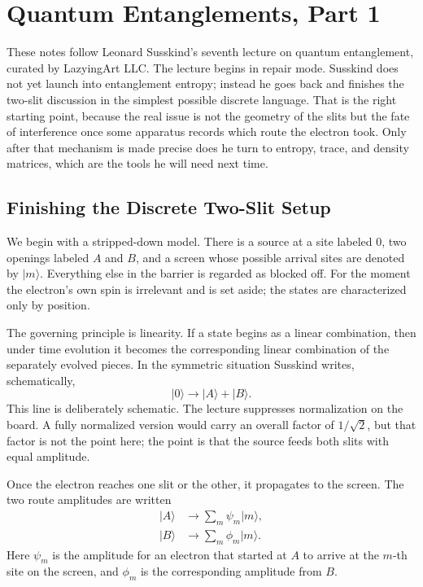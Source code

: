 \chapter{Quantum Entanglements, Part 1}

These notes follow Leonard Susskind's seventh lecture on quantum entanglement, curated by LazyingArt LLC. The lecture begins in repair mode. Susskind does not yet launch into entanglement entropy; instead he goes back and finishes the two-slit discussion in the simplest possible discrete language. That is the right starting point, because the real issue is not the geometry of the slits but the fate of interference once some apparatus records which route the electron took. Only after that mechanism is made precise does he turn to entropy, trace, and density matrices, which are the tools he will need next time.

\section{Finishing the Discrete Two-Slit Setup}

We begin with a stripped-down model. There is a source at a site labeled \(0\), two openings labeled \(A\) and \(B\), and a screen whose possible arrival sites are denoted by \(|m\rangle\). Everything else in the barrier is regarded as blocked off. For the moment the electron's own spin is irrelevant and is set aside; the states are characterized only by position.

The governing principle is linearity. If a state begins as a linear combination, then under time evolution it becomes the corresponding linear combination of the separately evolved pieces. In the symmetric situation Susskind writes, schematically,
\begin{equation}
|0\rangle \longrightarrow |A\rangle + |B\rangle .
\end{equation}
This line is deliberately schematic. The lecture suppresses normalization on the board. A fully normalized version would carry an overall factor of \(1/\sqrt{2}\), but that factor is not the point here; the point is that the source feeds both slits with equal amplitude.

Once the electron reaches one slit or the other, it propagates to the screen. The two route amplitudes are written
\begin{align}
|A\rangle &\longrightarrow \sum_m \psi_m |m\rangle , \\
|B\rangle &\longrightarrow \sum_m \phi_m |m\rangle .
\end{align}
Here \(\psi_m\) is the amplitude for an electron that started at \(A\) to arrive at the \(m\)-th site on the screen, and \(\phi_m\) is the corresponding amplitude from \(B\).


